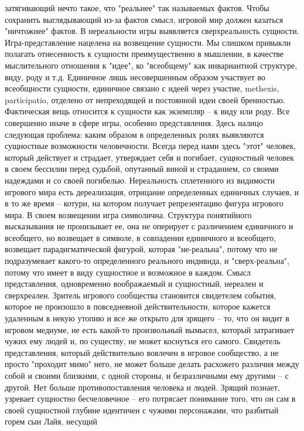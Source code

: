 \documentclass[12pt]{article}
\begin{document}
затягивающий нечто такое, что "реальнее" так называемых фактов. Чтобы сохранить выглядывающий из-за
фактов  смысл,  игровой  мир  должен  казаться  "ничтожнее"  фактов.  В  нереальности  игры  выявляется
сверхреальность сущности. Игра-представление нацелена на возвещение сущности. Мы слишком привыкли
полагать отнесенность к сущности преимущественно в мышлении, в качестве мыслительного отношения к
"идее", ко "всеобщему" как инвариантной структуре, виду, роду и т.д. Единичное лишь несовершенным образом
участвует во всеобщности сущности, единичное связано с идеей через участие, methexis, participatio, отделено
от непреходящей и постоянной идеи своей бренностью. Фактическая вещь относится к сущности как экземпляр
-- к виду или роду. Все совершенно иначе в сфере игры, особенно представления. Здесь налицо следующая
проблема: каким образом в определенных ролях выявляются сущностные возможности человечности. Всегда
перед  нами  здесь  "этот"  человек, который действует и страдает, утверждает себя и погибает, сущностный
человек в своем бессилии перед судьбой, опутанный виной и страданием, со своими надеждами и со своей
погибелью.  Нереальность  сплетенного  из  видимости  игрового  мира  есть  дереализация,  отрицание
определенных единичных случаев, и в то же время -- котурн, на котором получает репрезентацию фигура
игрового мира. В своем возвещении игра символична. Структура понятийного высказывания не пронизывает ее,
она не оперирует с различением единичного и всеобщего, но возвещает в символе, в совпадении единичного и
всеобщего, возвещает парадигматической фигурой, которая "не-реальна", потому что не подразумевает какого-то определенного реального индивида, и "сверх-реальна", потому что имеет в виду сущностное и возможное в
каждом. Смысл представления, одновременно воображаемый и сущностный, нереален и сверхреален. Зритель
игрового сообщества становится свидетелем события, которое не произошло в повседневной действительности,
которое кажется удаленным в некую утопию и все же открыто для зрящего -- то, что он видит в игровом
медиуме, не есть какой-то произвольный вымысел, который затрагивает чужих ему людей и, по существу, не
может коснуться его самого. Свидетель представления, который действительно вовлечен в игровое сообщество,
а  не  просто  "проходит  мимо"  него,  не  может  больше  делать  расхожего  различия  между  собой  и  своими
близкими,  с  одной  стороны,  и  безразличными  ему  другими  --  с  другой.  Нет  больше  противопоставления
человека и людей. Зрящий познает, узревает сущностно бесчеловечное -- его потрясает понимание того, что он
сам в своей сущностной глубине идентичен с чужими персонажами, что разбитый горем сын Лайя, несущий
\end{document}
